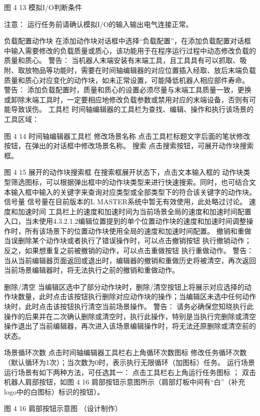 图 4 13 模拟I/O判断条件

 	注意：
运行任务前请确认模拟I/O的输入输出电气连接正常。

负载配置动作块
在添加动作块对话框中选择“负载配置”，在添加负载配置对话框中输入需要修改的负载质量或质心，该功能用于在程序运行过程中动态修改负载的质量和质心。
 	警告：
当机器人末端安装有末端工具，且工具具有可以抓取、吸附、取放物品等功能时，需要在时间轴编辑器的对应位置插入经取、放后末端负载质量和质心对应变化的动作块，如未正常设置，可能降低机器人相应部件寿命。
 	警告：
添加负载配置时，质量和质心的设置必须尽量与末端工具质量一致，更换或卸除末端工具时，一定要相应地修改负载参数或禁用对应的末端设备，否则有可能导致误伤。 
工具栏
时间轴编辑器的工具栏为查找、编辑、操作和执行该场景的工具区域：
 
图 4 14 时间轴编辑器工具栏
修改场景名称
点击工具栏标题文字后面的笔状修改按钮，在弹出的对话框中修改场景名称。
搜索
点击搜索按钮，可展开动作块搜索框。
 
图 4 15 展开的动作块搜索框
在搜索框展开状态下，点击文本输入框的 动作块类型筛选图标，可以根据弹出框中的动作块类型来进行快速搜索。同时，也可结合文本输入框中输入的关键字来查询对应类型或全部类型下的符合该关键字的动作块。
信号量
信号量在目前版本的L MASTER系统中暂无有效使用，此处略过讨论。
速度和加速时间
工具栏上的速度和加速时间为当前场景全局的速度和加速时间配置入口，当未使用4.3.2.1.2编辑位置提到的单个位置动作块的速度和加速时间调整操作时，所有该场景下的位置动作块使用全局的速度和加速时间配置。
撤销和重做
当误删除某个动作块或者执行了错误操作时，可以点击撤销按钮 执行撤销动作；反之，如果想重复之前被撤销的动作，可以点击重做按钮 执行重做动作。
 	警告：
当从当前编辑器页面返回或退出时，编辑器的撤销和重做历史将被清空，再次返回当前场景编辑器时，将无法执行之前的撤销和重做动作。

删除/清空
当编辑区选中了部分动作块时，删除/清空按钮上将展示对应选择的动作块数量，此时点击该按钮执行删除对应动作块的操作；当编辑区未选中任何动作块时，此时点击该按钮执行清空当前场景操作。
 	警告：
请务必确保您知晓执行此操作的后果并在二次确认删除或清空时，执行此操作，特别是当执行完删除或清空操作退出了当前编辑器，再次进入该场景编辑操作时，将无法还原删除或清空前的状态。

场景循环次数
点击时间轴编辑器工具栏右上角循环次数图标 修改任务循环次数（默认循环为1次）；当次数为0时，表示执行无限循环（加图标）任务。
运行场景
运行场景有如下两种方法，可任选其一：
点击工具栏右上角运行任务图标 ；
双击机器人肩部按钮，如图 4 16 肩部按钮示意图所示（肩部灯板中间有“白”（补充logo中的白图标）标识的按钮）。

 
图 4 16 肩部按钮示意图
（设计制作）

